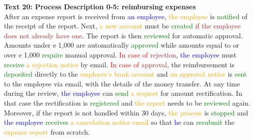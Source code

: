 \textbf{Text 20: Process Description 0-5: reimbursing expenses \cite{text_02}}\\
After an expense report is received from \textcolor{blue}{an employee}, \textcolor{orange}{the employee} is \textcolor{green}{notified} of the receipt of the report. Next, \textcolor{orange}{a new account} must be \textcolor{green}{created} \textcolor{red}{if} \textcolor{brown}{the employee does not already have one}. The report is then \textcolor{green}{reviewed} for automatic approval. Amounts under e 1,000 are automatically \textcolor{green}{approved} while amounts equal to or over e 1,000 \textcolor{green}{require} manual approval. \textcolor{red}{In case of} \textcolor{brown}{rejection}, \textcolor{blue}{the employee} must \textcolor{green}{receive} \textcolor{orange}{a rejection notice} by email. \textcolor{red}{In case of} \textcolor{brown}{approval}, the reimbursement is \textcolor{green}{deposited} directly to the \textcolor{orange}{employee’s bank account} and \textcolor{orange}{an approval notice} is \textcolor{green}{sent} to the employee via email, with the details of the money transfer. At any time during the review, \textcolor{blue}{the employee} can \textcolor{green}{send} \textcolor{orange}{a request} for amount rectification. In that case the rectification is \textcolor{green}{registered} and \textcolor{orange}{the report} needs to be \textcolor{green}{reviewed} again. Moreover, if the report is not handled within 30 days, \textcolor{orange}{the process} is \textcolor{green}{stopped} and \textcolor{blue}{the employee} \textcolor{green}{receives} \textcolor{orange}{a cancelation notice email} so that \textcolor{blue}{he} can \textcolor{green}{resubmit} the \textcolor{orange}{expense report} from scratch.





